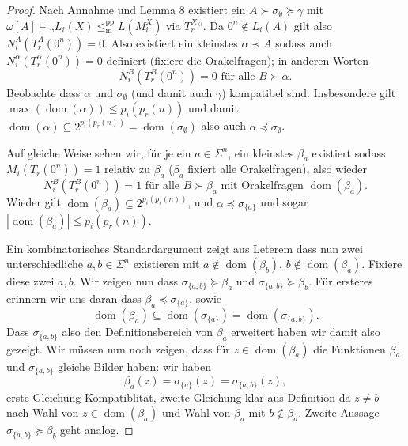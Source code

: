\documentclass[nofonts]{uebung}
\theoremstyle{definition}
\DeclareMathOperator{\dom}{dom}
\def\leqmpp{\ensuremath{\leq_\mathrm{m}^\mathrm{pp}}}
\begin{document}
\begin{proof}
    Nach Annahme und Lemma 8 existiert ein $A\succ\sigma_\emptyset\succeq \gamma$ mit $\omega[A] \vDash „L_{i}(X)\leqmpp L(M_i^X)\text{ via }T^X_r“$.
    Da $0^n\not\in L_i(A)$ gilt also $N^A_i(T_r^A(0^n))=0$.
    Also existiert ein kleinstes $\alpha\prec A$ sodass auch $N^\alpha_i(T_r^\alpha(0^n))=0$ definiert (fixiere die Orakelfragen); in anderen Worten
    \begin{equation}
        N^B_i(T_r^B(0^n))=0 \text{ für alle }B\succ\alpha.\label{eq:up-rejects}
    \end{equation}
    Beobachte dass $\alpha$ und $\sigma_\emptyset$ (und damit auch $\gamma$) kompatibel sind.
    Insbesondere gilt $\max(\dom(\alpha))\leq p_i(p_r(n))$ und damit $\dom(\alpha)\subseteq 2^{p_i(p_r(n))}=\dom(\sigma_\emptyset)$ also auch $\alpha\preceq \sigma_\emptyset$.

    Auf gleiche Weise sehen wir, für je ein $a\in\Sigma^n$, ein kleinstes $\beta_a$ existiert sodass $M_i(T_r(0^n))=1$ relativ zu $\beta_a$ ($\beta_a$ fixiert alle Orakelfragen), also wieder
    \begin{equation}
        N^B_i(T_r^B(0^n))=1 \text{ für alle $B\succ\beta_a$ mit Orakelfragen $\dom(\beta_a)$}.\label{eq:up-accepts}
    \end{equation}
    Wieder gilt $\dom(\beta_a)\subseteq 2^{p_i(p_r(n))}$, und $\alpha\preceq \sigma_{\{a\}}$ und sogar $|\dom(\beta_a)|\leq p_i(p_r(n))$.

    Ein kombinatorisches Standardargument zeigt aus Leterem dass nun zwei unterschiedliche $a,b\in \Sigma^n$ existieren mit $a\not\in \dom(\beta_b)$, $b\not\in \dom(\beta_a)$. Fixiere diese zwei $a,b$.
    Wir zeigen nun dass $\sigma_{\{a,b\}} \succeq \beta_a$ und $\sigma_{\{a,b\}} \succeq \beta_b$.
    Für ersteres erinnern wir uns daran dass $\beta_a\preceq\sigma_{\{a\}}$, sowie
    \[ \dom(\beta_a)\subseteq \dom(\sigma_{\{a\}})=\dom(\sigma_{\{a,b\}}). \]
    Dass $\sigma_{\{a,b\}}$ also den Definitionsbereich von $\beta_a$ erweitert haben wir damit also gezeigt. Wir müssen nun noch zeigen, dass für $z\in\dom(\beta_a)$ die Funktionen $\beta_a$ und $\sigma_{\{a,b\}}$ gleiche Bilder haben: wir haben
    \[ \beta_a(z)=\sigma_{\{a\}}(z)=\sigma_{\{a,b\}}(z), \]
    erste Gleichung Kompatiblität, zweite Gleichung klar aus Definition da $z\neq b$ nach Wahl von $z\in\dom(\beta_a)$ und Wahl von $\beta_a$ mit $b\not\in \beta_a$.
    Zweite Aussage $\sigma_{\{a,b\}} \succeq \beta_b$ geht analog.


\end{proof}
\end{document}
